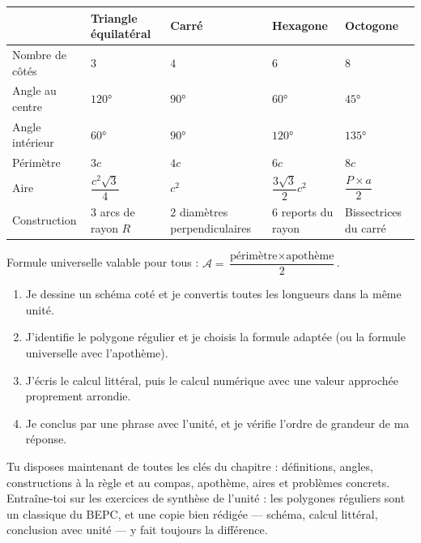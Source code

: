 \documentclass[11pt]{article}
\begin{document}
\begin{aretenir}
\begin{center}
\begin{tabularx}{\linewidth}{|l|X|X|X|X|}
\hline
\rowcolor{popblueL} & \textbf{Triangle équilatéral} & \textbf{Carré} & \textbf{Hexagone} & \textbf{Octogone} \\
\hline Nombre de côtés & $3$ & $4$ & $6$ & $8$ \\
\hline Angle au centre & $120°$ & $90°$ & $60°$ & $45°$ \\
\hline Angle intérieur & $60°$ & $90°$ & $120°$ & $135°$ \\
\hline Périmètre & $3c$ & $4c$ & $6c$ & $8c$ \\
\hline Aire & $\dfrac{c^2\sqrt{3}}{4}$ & $c^2$ & $\dfrac{3\sqrt{3}}{2}c^2$ & $\dfrac{P \times a}{2}$ \\
\hline Construction & $3$ arcs de rayon $R$ & $2$ diamètres perpendiculaires & $6$ reports du rayon & Bissectrices du carré \\
\hline
\end{tabularx}
\end{center}
Formule universelle valable pour tous : $\mathcal{A} = \dfrac{\text{périmètre} \times \text{apothème}}{2}$.
\end{aretenir}

\begin{methode}
\begin{enumerate}
\item Je dessine un schéma coté et je convertis toutes les longueurs dans la même unité.
\item J'identifie le polygone régulier et je choisis la formule adaptée (ou la formule universelle avec l'apothème).
\item J'écris le calcul littéral, puis le calcul numérique avec une valeur approchée proprement arrondie.
\item Je conclus par une phrase avec l'unité, et je vérifie l'ordre de grandeur de ma réponse.
\end{enumerate}
\end{methode}

Tu disposes maintenant de toutes les clés du chapitre : définitions, angles, constructions à la règle et au compas, apothème, aires et problèmes concrets. Entraîne-toi sur les exercices de synthèse de l'unité : les polygones réguliers sont un classique du BEPC, et une copie bien rédigée — schéma, calcul littéral, conclusion avec unité — y fait toujours la différence.
\end{document}
